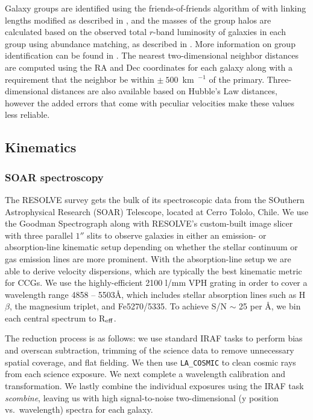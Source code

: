 \documentclass[iop,apj]{emulateapj}
\newcommand{\Reff}{R$_{\rm eff}$}
\begin{document}
Galaxy groups are identified using the friends-of-friends algorithm of \citet{Berlind2006} with linking lengths modified as described in \citet{Eckert2016}, and the masses of the group halos are calculated based on the observed total $r$-band luminosity of galaxies in each group using abundance matching, as described in \citet{Blanton2007}. More information on group identification can be found in \citet{Eckert2016}. The nearest two-dimensional neighbor distances are computed using the RA and Dec coordinates for each galaxy along with a requirement that the neighbor be within $\pm~500$~km~$^{-1}$ of the primary. Three-dimensional distances are also available based on Hubble's Law distances, however the added errors that come with peculiar velocities make these values less reliable.

\subsection{Kinematics}
\label{kindata}

\subsubsection{SOAR spectroscopy}
  The RESOLVE survey gets the bulk of its spectroscopic data from the SOuthern Astrophysical Research (SOAR) Telescope, located at Cerro Tololo, Chile. We use the Goodman Spectrograph \citep{Clemens2004} along with RESOLVE's custom-built image slicer with three parallel $1''$ slits to observe galaxies in either an emission- or absorption-line kinematic setup depending on whether the stellar continuum or gas emission lines are more prominent. With the absorption-line setup we are able to derive velocity dispersions, which are typically the best kinematic metric for CCGs. We use the highly-efficient 2100 l/mm VPH grating in order to cover a wavelength range 4858 -- 5503\AA, which includes stellar absorption lines such as H$\beta$, the magnesium triplet, and Fe5270/5335. To achieve S/N $\sim$ 25 per \AA, we bin each central spectrum to \Reff.

The reduction process is as follows: we use standard IRAF tasks to perform bias and overscan subtraction, trimming of the science data to remove unnecessary spatial coverage, and flat fielding. We then use \texttt{LA\_COSMIC} \citep{vanDokkum2001} to clean cosmic rays from each science exposure. We next complete a wavelength calibration and transformation. We lastly combine the individual exposures using the IRAF task \textit{scombine}, leaving us with high signal-to-noise two-dimensional (y position vs.~wavelength) spectra for each galaxy.
\end{document}
